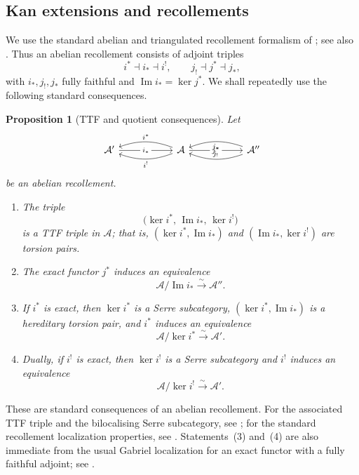 \documentclass[12pt,reqno]{amsart}
\newtheorem{proposition}[theorem]{Proposition}
\theoremstyle{definition}
\theoremstyle{remark}
\begin{document}
\subsection{Kan extensions and recollements}
\label{subsec:recollement-background}
We use the standard abelian and triangulated recollement formalism of
\cite{FP,BBD}; see also \cite{Psaroudakis,PV}.  Thus an abelian recollement
consists of adjoint triples
\[
i^*\dashv i_*\dashv i^!,
\qquad
j_!\dashv j^*\dashv j_*,
\]
with $i_*,j_!,j_*$ fully faithful and $\operatorname{Im}i_*=\ker j^*$.
We shall repeatedly use the following standard consequences.

\begin{proposition}[TTF and quotient consequences]\label{prop:recollement-ttf}
Let
\[
\begin{tikzcd}[column sep=5.5em]
\mathcal A'
  \arrow[r, "i_*" description]
&
\mathcal A
  \arrow[l, bend right=20, "i^*"']
  \arrow[l, bend left=20, "i^!"]
  \arrow[r, "j^*" description]
&
\mathcal A''
  \arrow[l, bend left=20, "j_!"']
  \arrow[l, bend right=20, "j_*"]
\end{tikzcd}
\]
be an abelian recollement.
\begin{enumerate}[label=\rm(\arabic*)]
\item The triple
\[
\bigl(\ker i^*,\,\operatorname{Im}i_*,\,\ker i^!\bigr)
\]
is a TTF triple in $\mathcal A$; that is,
$(\ker i^*,\operatorname{Im}i_*)$ and
$(\operatorname{Im}i_*,\ker i^!)$ are torsion pairs.
\item The exact functor $j^*$ induces an equivalence
\[
\mathcal A/\operatorname{Im}i_*
\xrightarrow{\sim}
\mathcal A''.
\]
\item If $i^*$ is exact, then $\ker i^*$ is a Serre subcategory,
$(\ker i^*,\operatorname{Im}i_*)$ is a hereditary torsion pair, and
$i^*$ induces an equivalence
\[
\mathcal A/\ker i^*
\xrightarrow{\sim}
\mathcal A'.
\]
\item Dually, if $i^!$ is exact, then $\ker i^!$ is a Serre subcategory and
$i^!$ induces an equivalence
\[
\mathcal A/\ker i^!
\xrightarrow{\sim}
\mathcal A'.
\]
\end{enumerate}
\end{proposition}

These are standard consequences of an abelian recollement.  For the associated
TTF triple and the bilocalising Serre subcategory, see
\cite[Theorem~4.3]{PV}; for the standard recollement localization properties,
see \cite[Section~2]{Psaroudakis}.  Statements~(3) and~(4) are also immediate
from the usual Gabriel localization for an exact functor with a fully faithful
adjoint; see \cite{Gabriel}.
\end{document}

